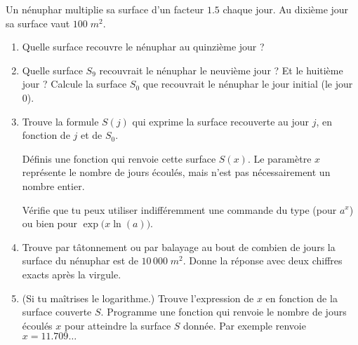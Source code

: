 \documentclass[11pt,class=report,crop=false]{standalone}
\begin{document}

\begin{activite}

  
  Un nénuphar multiplie sa surface d'un facteur $1.5$ chaque jour.
  Au dixième jour sa surface vaut $100\;m^2$.
  \begin{enumerate}
    \item Quelle surface recouvre le nénuphar au quinzième jour ?
    
    \item Quelle surface $S_9$ recouvrait le nénuphar le neuvième jour ? Et le huitième jour ? Calcule la surface $S_0$ que recouvrait le nénuphar le jour initial (le jour $0$).
    
    \item Trouve la formule $S(j)$ qui exprime la surface recouverte au jour $j$,
    en fonction de $j$ et de $S_0$.
    
    Définis une fonction  qui renvoie cette surface $S(x)$. Le paramètre $x$ représente le nombre de jours écoulés, mais n'est pas nécessairement un nombre entier.
    
    Vérifie que tu peux utiliser indifféremment une commande du type 
     (pour $a^x$) ou bien
     pour $\exp\big(x\ln(a)\big)$.
    
    \item Trouve par tâtonnement ou par balayage au bout de combien de jours la surface du nénuphar est de $10\,000\;m^2$. Donne la réponse avec deux chiffres exacts après la virgule.
    
    \item (Si tu maîtrises le logarithme.)
    Trouve l'expression de $x$ en fonction de la surface couverte $S$.
    Programme une fonction  qui renvoie le nombre de jours écoulés $x$ pour atteindre la surface $S$ donnée. Par exemple
    renvoie $x=11.709\ldots$
    
    
  \end{enumerate} 
\end{activite}



\end{document}
